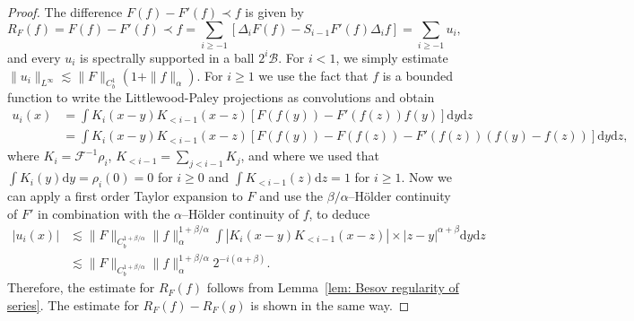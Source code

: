 \documentclass[11pt,a4paper]{article}
\newcommand{\mathd}{\mathrm{d}}
\theoremstyle{remark}
\newcommand{\CA}{\ensuremath{\mathscr{A}}}
\newcommand{\CB}{\ensuremath{\mathscr{B}}}
\newcommand{\CC}{\ensuremath{\mathscr{C}}}
\newcommand{\CF}{\ensuremath{\mathscr{F}}}
\begin{document}
\begin{proof}
   The difference $F(f) - F'(f)\prec f$ is given by
   \[
      R_F(f) = F(f) - F'(f)\prec f = \sum_{i \geqslant -1} [\Delta_i F(f) - S_{i-1} F'(f) \Delta_i f] = \sum_{i \geqslant -1} u_i,
   \]
   and every $u_i$ is spectrally supported in a ball $2^i \CB$. For $i<1$, we simply estimate $\| u_i\|_{L^\infty} \lesssim \|F\|_{C^1_b}(1+\|f\|_\alpha)$. For $i \geqslant 1$ we use the fact that $f$ is a bounded function to write the Littlewood-Paley projections as convolutions and obtain
  \begin{align*}
     u_i ( x ) & = \int K_{i} ( x-y ) K_{<i-1} ( x-z ) [F ( f ( y) ) - F'(f(z)) f(y)] \mathd y \mathd z \\
     & = \int K_{i} ( x-y ) K_{<i-1} ( x-z ) [ F ( f ( y ) ) -F ( f ( z ) ) - F'(f(z)) (f(y) - f(z)) ] \mathd y \mathd z,
  \end{align*}
  where $K_{i} = \CF^{-1} \rho_{i}$, $K_{<i-1} = \sum_{j<i-1} K_{j}$,
  and where we used that $\int K_{i} ( y ) \mathd y= \rho_{i} ( 0 ) =0$ for $i \geqslant 0$ and $\int K_{<i-1} ( z ) \mathd z=1$ for $i \geqslant 1$. Now we can apply a first order Taylor expansion to $F$ and use the $\beta/\alpha$--H\"older continuity of $F'$ in combination with the $\alpha$--H\"older continuity of $f$, to deduce
  \begin{align*}
     |u_i(x)| & \lesssim \|F\|_{C^{1+\beta/\alpha}_b} \|f\|_\alpha^{1+\beta/\alpha} \int |K_{i} ( x-y ) K_{<i-1} ( x-z )| \times |z-y|^{\alpha+\beta} \mathd y \mathd z \\
     & \lesssim \|F\|_{C^{1+\beta/\alpha}_b} \|f\|_\alpha^{1+\beta/\alpha} 2^{-i(\alpha+\beta)}.
  \end{align*}
  Therefore, the estimate for $R_F(f)$ follows from Lemma~\ref{lem: Besov regularity of series}. The estimate for $R_F(f) - R_F(g)$ is shown in the same way.
%  

\end{proof}
\end{document}
